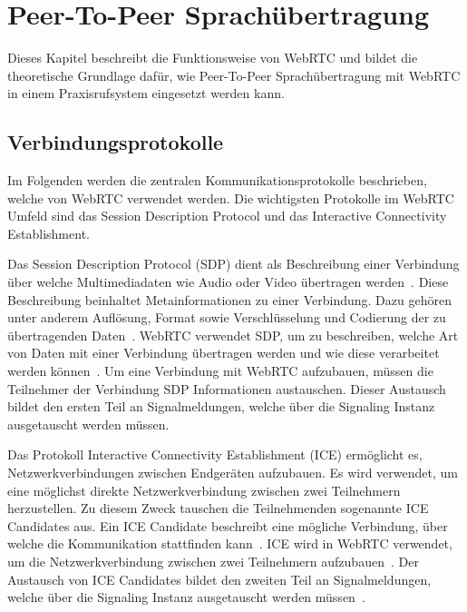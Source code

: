 \section{Peer-To-Peer Sprachübertragung}

Dieses Kapitel beschreibt die Funktionsweise von WebRTC und bildet die theoretische Grundlage dafür, wie Peer-To-Peer Sprachübertragung mit WebRTC in einem Praxisrufsystem eingesetzt werden kann.

\subsection{Verbindungsprotokolle}

Im Folgenden werden die zentralen Kommunikationsprotokolle beschrieben, welche von WebRTC verwendet werden.
Die wichtigsten Protokolle im WebRTC Umfeld sind das Session Description Protocol und das Interactive Connectivity Establishment.

Das Session Description Protocol (SDP) dient als Beschreibung einer Verbindung über welche Multimediadaten wie Audio oder Video übertragen werden~\cite{rfc_4566_sdp}.
Diese Beschreibung beinhaltet Metainformationen zu einer Verbindung.
Dazu gehören unter anderem Auflösung, Format sowie Verschlüsselung und Codierung der zu übertragenden Daten~\cite{mozilla_webRTC_protocols}.
WebRTC verwendet SDP, um zu beschreiben, welche Art von Daten mit einer Verbindung übertragen werden und wie diese verarbeitet werden können~\cite{webrtc_spec}.
Um eine Verbindung mit WebRTC aufzubauen, müssen die Teilnehmer der Verbindung SDP Informationen austauschen.
Dieser Austausch bildet den ersten Teil an Signalmeldungen, welche über die Signaling Instanz ausgetauscht werden müssen.

Das Protokoll Interactive Connectivity Establishment (ICE) ermöglicht es, Netzwerkverbindungen zwischen Endgeräten aufzubauen.
Es wird verwendet, um eine möglichst direkte Netzwerkverbindung zwischen zwei Teilnehmern herzustellen.
Zu diesem Zweck tauschen die Teilnehmenden sogenannte ICE Candidates aus.
Ein ICE Candidate beschreibt eine mögliche Verbindung, über welche die Kommunikation stattfinden kann~\cite{rfc_8445_ice}.
ICE wird in WebRTC verwendet, um die Netzwerkverbindung zwischen zwei Teilnehmern aufzubauen~\cite{mozilla_webRTC_protocols}.
Der Austausch von ICE Candidates bildet den zweiten Teil an Signalmeldungen, welche über die Signaling Instanz ausgetauscht werden müssen~\cite{webrtc_spec}.


